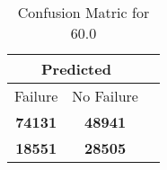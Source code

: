 \begin{table}[] 
\caption{Confusion Matric for 60.0} 
\label{Table: Prediction Accuracy-DMD60.0OnlySunEKF-resetReflection-Reflection} 
\centering 
\begin{tabular} 
 {@{}ccc@{}} 
\toprule 
\multicolumn{2}{c}{\textbf{Predicted}}
 \\ \midrule 
\multicolumn{1}{|c|}{Failure} & 
\multicolumn{1}{c|}{No Failure}
 \\ \midrule 
\multicolumn{1}{|c|}{\color{green}\textbf{74131}} & 
\multicolumn{1}{c|}{\color{green}\textbf{48941}}
 \\ \midrule 
\multicolumn{1}{|c|}{\color{red}\textbf{18551}} & 
\multicolumn{1}{c|}{\color{red}\textbf{28505}}
 \\ \bottomrule 
\end{tabular} 
\end{table} 
